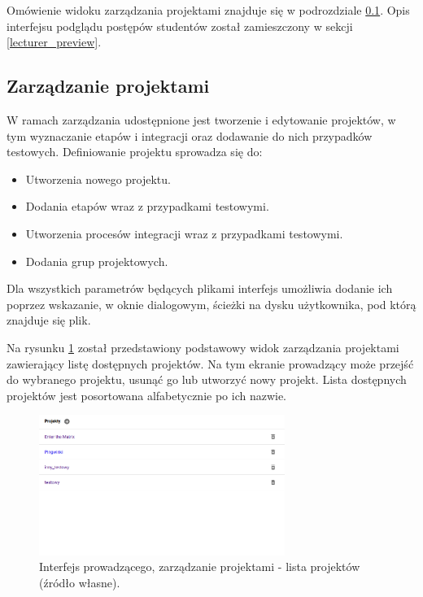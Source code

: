 Omówienie widoku zarządzania projektami znajduje się w podrozdziale \ref{lecturer-management}.
Opis interfejsu podglądu postępów studentów został zamieszczony w sekcji \ref{lecturer_preview}.

\subsection{Zarządzanie projektami}
\label{lecturer-management}

W ramach zarządzania udostępnione jest tworzenie i edytowanie projektów, w tym wyznaczanie etapów i integracji oraz dodawanie do nich przypadków testowych.
Definiowanie projektu sprowadza się do:
\begin {itemize}
    \item Utworzenia nowego projektu.
    \item Dodania etapów wraz z przypadkami testowymi.
    \item Utworzenia procesów integracji wraz z przypadkami testowymi.
    \item Dodania grup projektowych.
\end {itemize}

Dla wszystkich parametrów będących plikami interfejs umożliwia dodanie ich poprzez wskazanie, w oknie dialogowym, ścieżki na dysku użytkownika, pod którą znajduje się plik.

Na rysunku \ref{fig:lecturer_projects_list} został przedstawiony podstawowy widok zarządzania projektami zawierający listę dostępnych projektów.
Na tym ekranie prowadzący może przejść do wybranego projektu, usunąć go lub utworzyć nowy projekt.
Lista dostępnych projektów jest posortowana alfabetycznie po ich nazwie.

\begin{figure}[h]
    \centering
    \includegraphics[width = 8cm]{chapter04/lecturer_projects_list.png}
    \caption{Interfejs prowadzącego, zarządzanie projektami - lista projektów (źródło własne).}
    \label{fig:lecturer_projects_list}
\end{figure}

